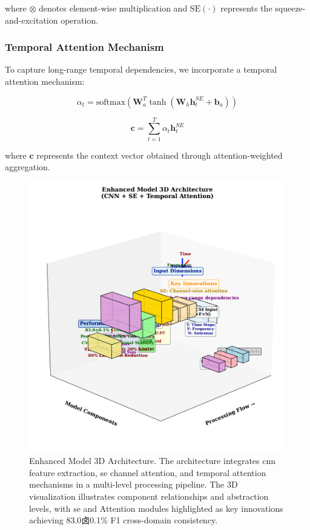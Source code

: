 \documentclass[journal]{IEEEtran}
\begin{document}
where $\otimes$ denotes element-wise multiplication and $\text{SE}(\cdot)$ represents the squeeze-and-excitation operation.

\subsubsection{Temporal Attention Mechanism}

To capture long-range temporal dependencies, we incorporate a temporal attention mechanism:

\begin{equation}
\alpha_t = \text{softmax}(\mathbf{W}_a^T \tanh(\mathbf{W}_h \mathbf{h}_t^{SE} + \mathbf{b}_a))
\end{equation}

\begin{equation}
\mathbf{c} = \sum_{t=1}^{T} \alpha_t \mathbf{h}_t^{SE}
\end{equation}

where $\mathbf{c}$ represents the context vector obtained through attention-weighted aggregation.

\begin{figure}[ht]
\centering
\includegraphics[width=\columnwidth]{figures/figure3_enhanced_3D.pdf}
\caption{Enhanced Model 3D Architecture. The architecture integrates \gls{cnn} feature extraction, \gls{se} channel attention, and temporal attention mechanisms in a multi-level processing pipeline. The 3D visualization illustrates component relationships and abstraction levels, with \gls{se} and Attention modules highlighted as key innovations achieving 83.0卤0.1\% F1 cross-domain consistency.}
\label{fig:enhanced_3d_arch}
\end{figure}
\end{document}
